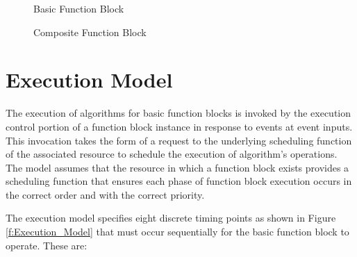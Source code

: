 %
\begin{figure}
\begin{center}
\caption[Basic Function Block]{Basic Function Block{\protect
~\cite{iec:61499:2000}}} \label{f:Basic_Block}
\end{center}
\end{figure}
%

%
\begin{figure}
\begin{center}
\caption[Composite Function Block]{Composite Function
Block{\protect ~\cite{iec:61499:2000}}} \label{f:Composite_Block}
\end{center}
\end{figure}
%

\section{Execution Model}

The execution of algorithms for basic function blocks is invoked
by the execution control portion of a function block instance in
response to events at event inputs. This invocation takes the form
of a request to the underlying scheduling function of the
associated resource to schedule the execution of algorithm's
operations. The model assumes that the resource in which a
function block exists provides a scheduling function that ensures
each phase of function block execution occurs in the correct order
and with the correct priority.

The execution model specifies eight discrete timing points as
shown in Figure \ref{f:Execution_Model} that must occur
sequentially for the basic function block to operate. These are:

